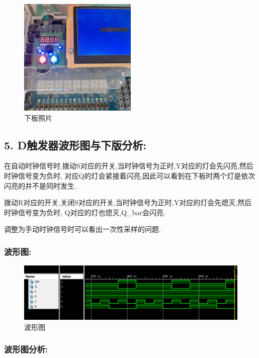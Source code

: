 \documentclass{article}
\begin{document}
    \begin{figure}[H]
    \centering
    \includegraphics[width=0.5\textwidth]{lab9p/26.jpg}
    \caption{\label{Lab9}下板照片}
    \end{figure}

\subsection*{5. D触发器波形图与下版分析:}

在自动时钟信号时,拨动S对应的开关,当时钟信号为正时,Y对应的灯会先闪亮,然后时钟信号变为负时,
对应Q的灯会紧接着闪亮,因此可以看到在下板时两个灯是依次闪亮的并不是同时发生.

拨动R对应的开关,关闭S对应的开关,当时钟信号为正时,Y对应的灯会先熄灭,然后时钟信号变为负时,
Q对应的灯也熄灭,Q\_bar会闪亮.

调整为手动时钟信号时可以看出一次性采样的问题.

\subsubsection*{波形图:}
    \begin{figure}[H]
    \centering
    \includegraphics[width=1\textwidth]{lab9p/10.png}
    \caption{\label{Lab9}波形图}
    \end{figure}


\subsubsection*{波形图分析:}
\end{document}
